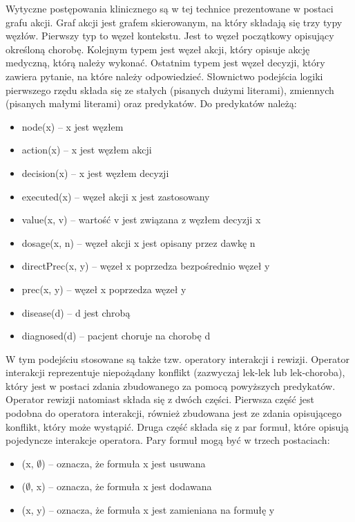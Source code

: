 \documentclass[oneside,a4paper]{book}
\begin{document}
\begin{spacing}{1.5}
Wytyczne postępowania klinicznego są w tej technice prezentowane w postaci grafu akcji.\cite{SzWilk} Graf akcji jest grafem skierowanym, na który składają się trzy typy węzłów. Pierwszy typ to węzeł kontekstu. Jest to węzeł początkowy opisujący określoną chorobę. Kolejnym typem jest węzeł akcji, który opisuje akcję medyczną, którą należy wykonać. Ostatnim typem jest węzeł decyzji, który zawiera pytanie, na które należy odpowiedzieć. Słownictwo podejścia logiki pierwszego rzędu składa się ze stałych (pisanych dużymi literami), zmiennych (pisanych małymi literami) oraz predykatów. Do predykatów należą:
\begin{itemize}
\item{node(x) – x jest węzłem}
\item{action(x) – x jest węzłem akcji}
\item{decision(x) – x jest węzłem decyzji}
\item{executed(x) – węzeł akcji x jest zastosowany}
\item{value(x, v) – wartość v jest związana z węzłem decyzji x}
\item{dosage(x, n) – węzeł akcji x jest opisany przez dawkę n}
\item{directPrec(x, y) – węzeł x poprzedza bezpośrednio węzeł y}
\item{prec(x, y) – węzeł x poprzedza węzeł y}
\item{disease(d) – d jest chrobą}
\item{diagnosed(d) – pacjent choruje na chorobę d}
\end{itemize}
W tym podejściu stosowane są także tzw. operatory interakcji i rewizji. Operator interakcji reprezentuje niepożądany konflikt (zazwyczaj lek-lek lub lek-choroba), który jest w postaci zdania zbudowanego za pomocą powyższych predykatów. Operator rewizji natomiast składa się z dwóch części. Pierwsza część jest podobna do operatora interakcji, również zbudowana jest ze zdania opisującego konflikt, który może wystąpić. Druga część składa się z par formuł, które opisują pojedyncze interakcje operatora. Pary formuł mogą być w trzech postaciach:
\begin{itemize}
\item{(x, $\emptyset$) – oznacza, że formuła x jest usuwana}
\item{($\emptyset$, x) – oznacza, że formuła x jest dodawana}
\item{(x, y) – oznacza, że formuła x jest zamieniana na formułę y}
\end{itemize}



\end{spacing}
\end{document}
